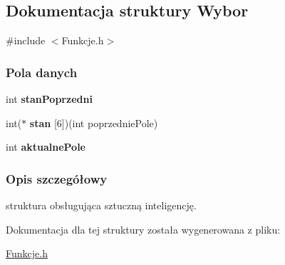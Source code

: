 \hypertarget{structWybor}{}\subsection{Dokumentacja struktury Wybor}
\label{structWybor}


{\ttfamily \#include $<$Funkcje.\+h$>$}

\subsubsection*{Pola danych}
\begin{DoxyCompactItemize}
\item 
\mbox{\label{structWybor_a2e7f0e72895dc61721d4dd30123e0336}} 
int {\bfseries stan\+Poprzedni}
\item 
\mbox{\label{structWybor_a6e60c9d448b94dbe9ada5f08e2ff0a0d}} 
int($\ast$ {\bfseries stan} \mbox{[}6\mbox{]})(int poprzednie\+Pole)
\item 
\mbox{\label{structWybor_af8cbf82b7ea11bbc708d4b17e0287a29}} 
int {\bfseries aktualne\+Pole}
\end{DoxyCompactItemize}


\subsubsection{Opis szczegółowy}
struktura obsługująca sztuczną inteligencję. 

Dokumentacja dla tej struktury została wygenerowana z pliku\+:\begin{DoxyCompactItemize}
\item 
\mbox{\hyperlink{Funkcje_8h}{Funkcje.\+h}}\end{DoxyCompactItemize}
